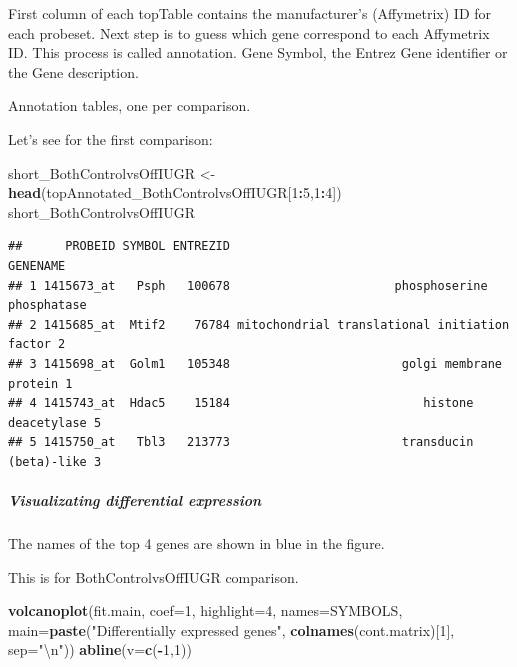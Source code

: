 \documentclass[]{article}
\newenvironment{Shaded}{\begin{snugshade}}{\end{snugshade}}
\newcommand{\KeywordTok}[1]{\textcolor[rgb]{0.13,0.29,0.53}{\textbf{#1}}}
\newcommand{\DataTypeTok}[1]{\textcolor[rgb]{0.13,0.29,0.53}{#1}}
\newcommand{\DecValTok}[1]{\textcolor[rgb]{0.00,0.00,0.81}{#1}}
\newcommand{\CharTok}[1]{\textcolor[rgb]{0.31,0.60,0.02}{#1}}
\newcommand{\StringTok}[1]{\textcolor[rgb]{0.31,0.60,0.02}{#1}}
\newcommand{\OperatorTok}[1]{\textcolor[rgb]{0.81,0.36,0.00}{\textbf{#1}}}
\newcommand{\NormalTok}[1]{#1}
\let\oldsubparagraph\subparagraph
\renewcommand{\subparagraph}[1]{\oldsubparagraph{#1}\mbox{}}
\begin{document}
First column of each topTable contains the manufacturer's (Affymetrix)
ID for each probeset. Next step is to guess which gene correspond to
each Affymetrix ID. This process is called annotation. Gene Symbol, the
Entrez Gene identifier or the Gene description.

Annotation tables, one per comparison.

Let's see for the first comparison:

\begin{Shaded}
\begin{Highlighting}[]
\NormalTok{short_BothControlvsOffIUGR <-}\StringTok{ }\KeywordTok{head}\NormalTok{(topAnnotated_BothControlvsOffIUGR[}\DecValTok{1}\OperatorTok{:}\DecValTok{5}\NormalTok{,}\DecValTok{1}\OperatorTok{:}\DecValTok{4}\NormalTok{]) }
\NormalTok{short_BothControlvsOffIUGR}
\end{Highlighting}
\end{Shaded}

\begin{verbatim}
##      PROBEID SYMBOL ENTREZID                                        GENENAME
## 1 1415673_at   Psph   100678                       phosphoserine phosphatase
## 2 1415685_at  Mtif2    76784 mitochondrial translational initiation factor 2
## 3 1415698_at  Golm1   105348                        golgi membrane protein 1
## 4 1415743_at  Hdac5    15184                           histone deacetylase 5
## 5 1415750_at   Tbl3   213773                        transducin (beta)-like 3
\end{verbatim}

\subparagraph{Visualizating differential
expression}\label{visualizating-differential-expression}

The names of the top 4 genes are shown in blue in the figure.

This is for BothControlvsOffIUGR comparison.

\begin{Shaded}
\begin{Highlighting}[]
\KeywordTok{volcanoplot}\NormalTok{(fit.main, }\DataTypeTok{coef=}\DecValTok{1}\NormalTok{, }\DataTypeTok{highlight=}\DecValTok{4}\NormalTok{, }\DataTypeTok{names=}\NormalTok{SYMBOLS, }
\DataTypeTok{main=}\KeywordTok{paste}\NormalTok{(}\StringTok{"Differentially expressed genes"}\NormalTok{, }\KeywordTok{colnames}\NormalTok{(cont.matrix)[}\DecValTok{1}\NormalTok{], }\DataTypeTok{sep=}\StringTok{"}\CharTok{\textbackslash{}n}\StringTok{"}\NormalTok{))}
\KeywordTok{abline}\NormalTok{(}\DataTypeTok{v=}\KeywordTok{c}\NormalTok{(}\OperatorTok{-}\DecValTok{1}\NormalTok{,}\DecValTok{1}\NormalTok{))}
\end{Highlighting}
\end{Shaded}
\end{document}
